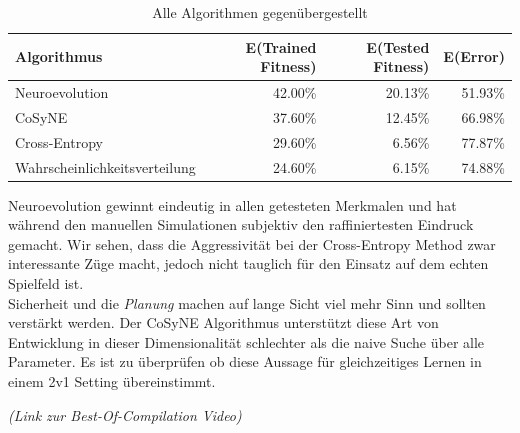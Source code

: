                 \begin{table}[H]
                    \begin{center}
                    \begin{tabular}{ |l|r|r|r| } 
                        \hline
                        \textbf{Algorithmus}          & E(Trained Fitness) & E(Tested Fitness) & E(Error)    \\ \hline
                        Neuroevolution                &          42.00\%   &         20.13\%   &    51.93\%  \\ \hline
                        CoSyNE                        &          37.60\%   &         12.45\%   &    66.98\%  \\ \hline
                        Cross-Entropy                 &          29.60\%   &          6.56\%   &    77.87\%  \\ \hline
                        Wahrscheinlichkeitsverteilung &          24.60\%   &          6.15\%   &    74.88\%  \\ \hline
                    \end{tabular}
                    \end{center}
                    \caption{Alle Algorithmen gegenübergestellt \label{fig:vergleichstabelle}}
                \end{table}

            \noindent
            Neuroevolution gewinnt eindeutig in allen getesteten Merkmalen und hat während den manuellen Simulationen subjektiv den raffiniertesten Eindruck gemacht. Wir sehen, dass die Aggressivität bei der Cross-Entropy Method zwar interessante Züge macht, jedoch nicht tauglich für den Einsatz auf dem echten Spielfeld ist. \\[2mm]

            \noindent
            Sicherheit und die \textit{Planung} machen auf lange Sicht viel mehr Sinn und sollten verstärkt werden. Der CoSyNE Algorithmus unterstützt diese Art von Entwicklung in dieser Dimensionalität schlechter als die naive Suche über alle Parameter. Es ist zu überprüfen ob diese Aussage für gleichzeitiges Lernen in einem 2v1 Setting übereinstimmt.\\[2mm]

            \begin{center} \textit{(Link zur Best-Of-Compilation Video)} \end{center}
